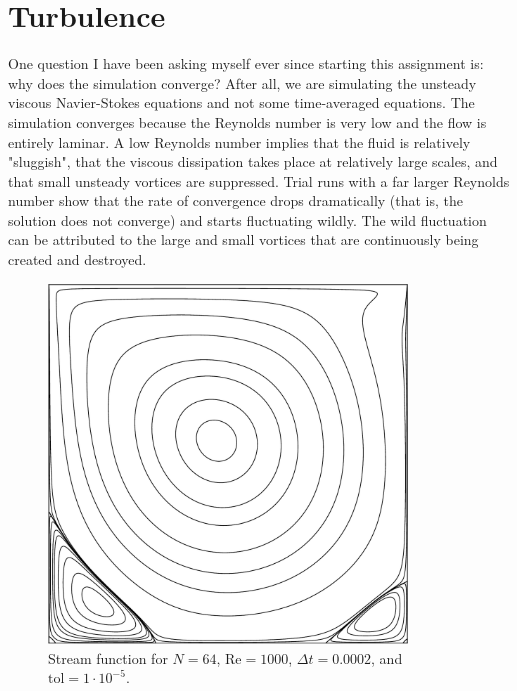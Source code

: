 \section{Turbulence}

One question I have been asking myself ever since starting this assignment is: why does the simulation converge? After all, we are simulating the unsteady viscous Navier-Stokes equations and not some time-averaged equations. The simulation converges because the Reynolds number is very low and the flow is entirely laminar. A low Reynolds number implies that the fluid is relatively "sluggish", that the viscous dissipation takes place at relatively large scales, and that small unsteady vortices are suppressed. Trial runs with a far larger Reynolds number show that the rate of convergence drops dramatically (that is, the solution does not converge) and starts fluctuating wildly. The wild fluctuation can be attributed to the large and small vortices that are continuously being created and destroyed.

\begin{figure}[p]
    \centering
    \includegraphics[width=0.85\textwidth]{Images/streamFunction.pdf}
    \caption{Stream function for $N = 64$, $\text{Re} = 1000$, $\Delta t = 0.0002$, and $\text{tol} = 1 \cdot 10^{-5}$.}
    \label{fig:SFN64}
\end{figure}

